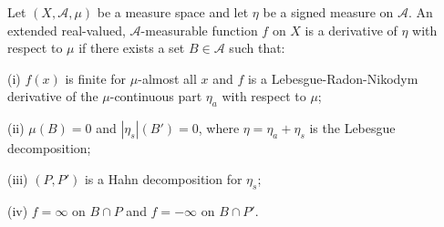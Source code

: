 Let $(X, \mathcal{A}, \mu)$ be a measure space and let $\eta$ be a signed measure on $\mathcal{A}$. An extended real-valued, $\mathcal{A}$-measurable function $f$ on $X$ is a derivative of $\eta$ with respect to $\mu$ if there exists a set $B \in \mathcal{A}$ such that:

(i) $f(x)$ is finite for $\mu$-almost all $x$ and $f$ is a Lebesgue-Radon-Nikodym derivative of the $\mu$-continuous part $\eta_a$ with respect to $\mu$;

(ii) $\mu(B) = 0$ and $|\eta_s|(B') = 0$, where $\eta = \eta_a + \eta_s$ is the Lebesgue decomposition;

(iii) $(P, P')$ is a Hahn decomposition for $\eta_s$;

(iv) $f = \infty$ on $B \cap P$ and $f = -\infty$ on $B \cap P'$.
